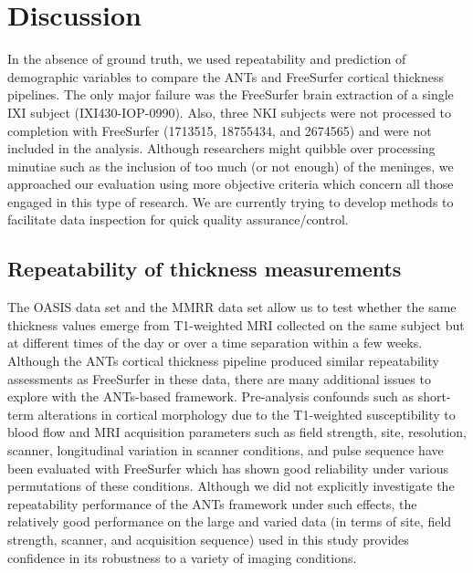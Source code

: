 \section{Discussion}
In the absence of ground truth, we used repeatability and prediction of
demographic variables to compare the ANTs and FreeSurfer cortical 
thickness pipelines.  
The only major failure was the FreeSurfer brain extraction of a single IXI subject 
(IXI430-IOP-0990).  Also, three NKI subjects were not processed to completion
with FreeSurfer (1713515, 18755434, and 2674565) and were not included in the analysis.
Although  researchers might quibble over processing minutiae such as the
inclusion of too much (or not enough) of the meninges, we approached
our evaluation using more objective criteria which concern all those
engaged in this type of research.  We are currently trying to develop methods
to facilitate data inspection for quick quality assurance/control.


\subsection{Repeatability of thickness measurements}
The OASIS data set and the MMRR data set allow us to test 
whether the same thickness values emerge from T1-weighted
MRI collected on the same subject but at different times of
the day or over a time separation within a few weeks.  
Although the ANTs cortical thickness pipeline produced similar
repeatability assessments as FreeSurfer in these data, there
are many additional issues to explore with the ANTs-based
framework.  Pre-analysis confounds such as short-term alterations in cortical 
morphology due to the T1-weighted susceptibility to blood flow 
\citep{Franklin2013,Salgado-Pineda2006,Yamasue2007} and
MRI acquisition parameters such as field strength, site, resolution, 
scanner, longitudinal variation in scanner conditions, and pulse sequence \citep{han2006,lusebrink2013,jovicich2013} have been evaluated
with FreeSurfer which has shown good reliability
under various permutations of these conditions.  
Although we did not explicitly investigate the repeatability performance of the 
ANTs framework under such effects, the relatively good performance
on the large and varied data (in terms of site, field strength, scanner,
and acquisition sequence) used in this study provides confidence in 
its robustness to a variety of imaging conditions.

